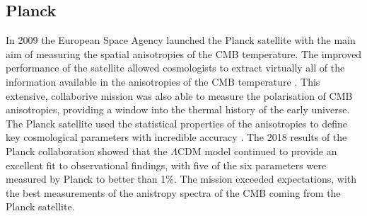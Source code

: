 \documentclass[twocolumn, prl, nobalancelastpage, aps, citeautoscript, longbibliography, 10pt]{revtex4-1}
\begin{document}
\subsection{Planck}
In 2009 the European Space Agency launched the Planck satellite with the main aim of measuring the spatial anisotropies of the CMB temperature. The improved performance of the satellite
allowed cosmologists to extract virtually all of the information available in the anisotropies of the CMB temperature \cite{Planck Early}. This extensive, collaborive mission was also
able to measure the polarisation of CMB anisotropies, providing a window into the thermal history of the early universe. The Planck satellite used the statistical properties of the anisotropies 
to define key cosmological parameters with incredible accuracy \cite{Hist}. The 2018 results of the Planck collaboration showed that the $\Lambda$CDM model continued to provide an excellent fit 
to observational findings, with five of the six parameters were measured by Planck to better than 1\%\cite{Planck Final}. The mission exceeded expectations, with the best measurements
of the anistropy spectra of the CMB coming from the Planck satellite. 
\end{document}
